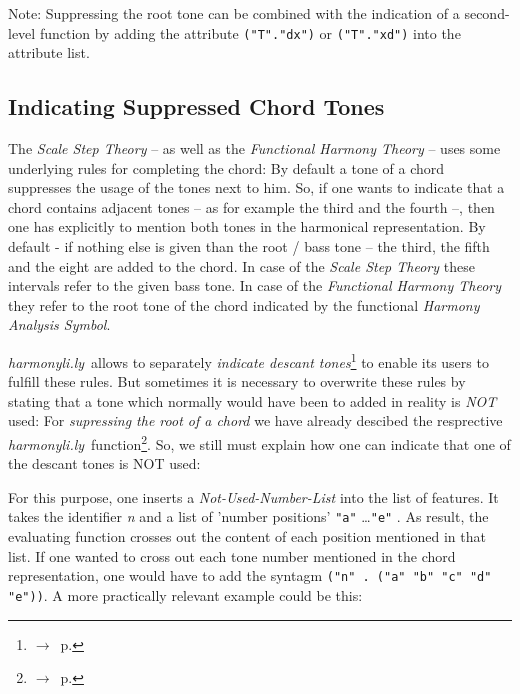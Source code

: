 \documentclass[
  DIV=calc,
  BCOR=5mm,
  12pt,
  headings=small,
  oneside,
  abstract=true,
  toc=bib,
  xcolor=dvipsnames,
  openany,
  ngerman,english]{scrartcl}
\newcommand{\acc}[0]{\textit}
\newcommand{\ra}[0]{$\rightarrow$}
\newcommand{\hlyn}[0]{\textit{harmonyli.ly}}
\newcommand{\has}[1]{\textit{Harmony Analysis Symbol#1}}
\begin{document}
Note: Suppressing the root tone can be combined with the indication of a
second-level function by adding the attribute \texttt{("T"."dx")} or
\texttt{("T"."xd")} into the attribute list.

\subsection{Indicating Suppressed Chord Tones}

The \acc{Scale Step Theory} -- as well as the \acc{Functional Harmony Theory} --
uses some underlying rules for completing the chord: By default a tone of a
chord suppresses the usage of the tones next to him. So, if one wants to
indicate that a chord contains adjacent tones -- as for example the third and
the fourth --, then one has explicitly to mention both tones in the harmonical
representation. By default - if nothing else is given than the root / bass tone
-- the third, the fifth and the eight are added to the chord. In case of the
\acc{Scale Step Theory} these intervals refer to the given bass tone. In case of
the \acc{Functional Harmony Theory} they refer to the root tone of the chord
indicated by the functional \has{}.

\hlyn\ allows to separately
\acc{indicate descant tones}\footnote{\ra\ p.\pageref{IndicateDescantTones}}
to enable its users to fulfill these rules. But sometimes it is necessary to
overwrite these rules by stating that a tone which normally would have been to
added in reality is \acc{NOT} used: For \acc{supressing the root of a chord} we
have already descibed the resprective \hlyn\ function\footnote{\ra\
p.\pageref{SupressRootTone}}. So, we still must explain how one can indicate
that one of the descant tones is {NOT} used:

For this purpose, one inserts a \acc{Not-Used-Number-List} into the list of
features. It takes the identifier \acc{n} and a list of 'number positions'
\verb|"a"| \ldots \verb|"e"| . As result, the evaluating function crosses out
the content of each position mentioned in that list. If one wanted to cross out
each tone number mentioned in the chord representation, one would have to add
the syntagm \verb|("n" . ("a" "b" "c" "d" "e"))|. A more practically relevant
example could be this:

\begin{center}
\end{center}
\end{document}
